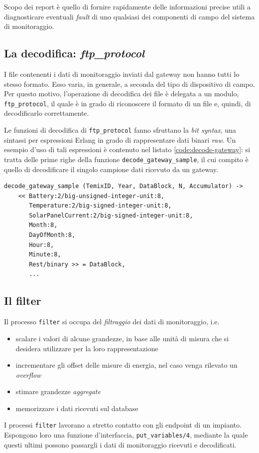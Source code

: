 %
Scopo dei report \`e quello di fornire rapidamente delle informazioni precise utili a diagnosticare 
eventuali \emph{fault} di uno qualsiasi dei componenti di campo del sistema di monitoraggio.
%

%
\subsection{La decodifica: \emph{ftp\_protocol}}
%
I file contenenti i dati di monitoraggio inviati dal gateway non hanno tutti lo stesso formato.
%
Esso varia, in generale, a seconda del tipo di dispositivo di campo. Per questo motivo, 
l'operazione di decodifica dei file \`e delegata a un modulo, \texttt{ftp\_protocol}, 
il quale \`e in grado di riconoscere il formato di un file e, quindi, di decodificarlo 
correttamente.
%

%
Le funzioni di decodifica di \texttt{ftp\_protocol} fanno sfruttano la \emph{bit syntax}, una 
sintassi per espressioni Erlang in grado di rappresentare dati binari \emph{raw}.
%
Un esempio d'uso di tali espressioni \`e contenuto nel listato \ref{code:decode-gateway}: si tratta
delle prime righe della funzione \texttt{decode\_gateway\_sample}, il cui compito \`e quello di 
decodificare il singolo campione dati ricevuto da un gateway.
%
\begin{lstlisting}[caption={Decodifica di un blocco dati del Gateway}, label={code:decode-gateway},frame=trBL]
decode_gateway_sample (TemixID, Year, DataBlock, N, Accumulator) ->
    << Battery:2/big-unsigned-integer-unit:8,
       Temperature:2/big-signed-integer-unit:8,
       SolarPanelCurrent:2/big-signed-integer-unit:8,
       Month:8,
       DayOfMonth:8,
       Hour:8,
       Minute:8,
       Rest/binary >> = DataBlock,
       ...
\end{lstlisting}
%

%
\subsection{Il filter}
Il processo \texttt{filter} si occupa del \emph{filtraggio} dei dati di monitoraggio, i.e.
\begin{itemize}
\item scalare i valori di alcune grandezze, in base alle unit\`a di misura che si desidera
      utilizzare per la loro rappresentazione
%
\item incrementare gli offset delle misure di energia, nel caso venga rilevato un \emph{overflow}
%
\item stimare grandezze \emph{aggregate}
%
\item memorizzare i dati ricevuti sul database
%
\end{itemize}
%
I processi \texttt{filter} lavorano a stretto contatto con gli endpoint di un impianto. 
%
Espongono loro una funzione d'interfaccia, \texttt{put\_variables/4}, mediante la quale 
questi ultimi possono passargli i dati di monitoraggio ricevuti e decodificati.
%


